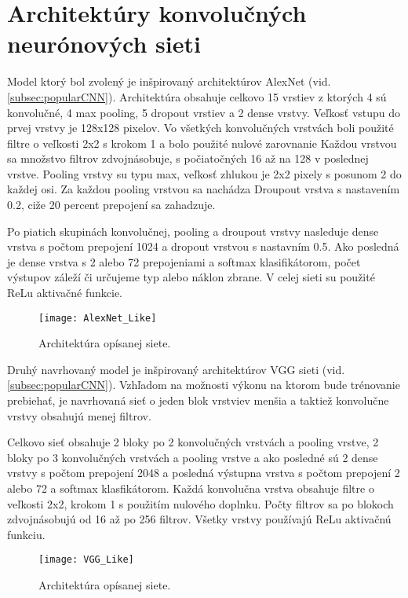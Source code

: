 
\section{Architektúry konvolučných neurónových sieti}
\label{sec:architekuraCNN}
Model ktorý bol zvolený je inšpirovaný architektúrov AlexNet (vid. \ref{subsec:popularCNN}).
Architektúra obsahuje celkovo 15 vrstiev z ktorých 4 sú konvolučné, 4 max pooling, 5 dropout vrstiev a 2 dense vrstvy.
Veľkosť vstupu do prvej vrstvy je 128x128 pixelov.
Vo všetkých konvolučných vrstvách boli použité filtre o veľkosti 2x2 s krokom 1 a bolo použité nulové zarovnanie
Každou vrstvou sa množstvo filtrov zdvojnásobuje, s počiatočných 16 až na 128 v poslednej vrstve.
Pooling vrstvy su typu max, veľkosť zhlukou je 2x2 pixely s posunom 2 do každej osi.
Za každou pooling vrstvou sa nachádza Droupout vrstva s nastavením 0.2, ciže 20 percent prepojení sa zahadzuje.

Po piatich skupinách konvolučnej, pooling a droupout vrstvy nasleduje dense vrstva s počtom prepojení 1024 a dropout vrstvou s nastavním 0.5.
Ako posledná je dense vrstva s 2 alebo 72 prepojeniami a softmax klasifikátorom, počet výstupov záleží či určujeme typ alebo náklon zbrane.
V celej sieti su použité ReLu aktivačné funkcie.

\begin{figure}[H]
    \centering
    \texttt{[image: AlexNet\_Like]}
    \caption{Architektúra opísanej siete.}
    \label{pic:kNN}
\end{figure}

Druhý navrhovaný model je inšpirovaný architektúrov VGG sieti (vid. \ref{subsec:popularCNN}).
Vzhľadom na možnosti výkonu na ktorom bude trénovanie prebiehať, je navrhovaná sieť o jeden blok vrstviev menšia a taktiež konvolučne vrstvy obsahujú menej filtrov.

Celkovo sieť obsahuje 2 bloky po 2 konvolučných vrstvách a pooling vrstve, 2 bloky po 3 konvolučných vrstvách a pooling vrstve a ako posledné
    sú 2 dense vrstvy s počtom prepojení 2048 a posledná výstupna vrstva s počtom prepojení 2 alebo 72 a softmax klasfikátorom.
Každá konvolučna vrstva obsahuje filtre o veľkosti 2x2, krokom 1 s použitím nulového doplnku.
Počty filtrov sa po blokoch zdvojnásobujú od 16 až po 256 filtrov.
Všetky vrstvy používajú ReLu aktivačnú funkciu.

\begin{figure}[H]
    \centering
    \texttt{[image: VGG\_Like]}
    \caption{Architektúra opísanej siete.}
    \label{pic:kNN}
\end{figure}

